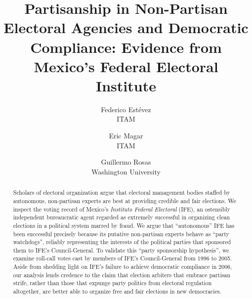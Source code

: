 \documentclass[12 pt, letter]{article}
\begin{document}
\singlespacing
\title{Partisanship in Non-Partisan Electoral Agencies and Democratic Compliance: Evidence from Mexico's Federal Electoral Institute}
\author{Federico Est\'evez\\ITAM
\and Eric Magar\\ITAM \and Guillermo Rosas\\Washington University}
\date{}
\maketitle
\begin{abstract}
Scholars of electoral organization argue that electoral management bodies staffed by autonomous, non-partisan experts are best at providing credible and fair elections.  We inspect the voting record of Mexico's \emph{Instituto Federal Electoral} (IFE), an ostensibly independent bureaucratic agent regarded as extremely successful in organizing clean elections in a political system marred by fraud.   We argue that ``autonomous'' IFE has been successful precisely because its putative non-partisan experts behave as ``party watchdogs'', reliably representing the interests of the political parties that sponsored them to IFE's Council-General.  To validate this ``party sponsorship hypothesis'', we examine roll-call votes cast by members of IFE's Council-General from 1996 to 2005.  Aside from shedding light on IFE's failure to achieve democratic compliance in 2006, our analysis lends credence to the claim that election arbiters that embrace partisan strife, rather than those that expunge party politics from electoral regulation altogether, are better able to organize free and fair elections in new democracies.
\end{abstract}
\vskip 4.5cm
\pagebreak
\doublespace

\end{document}

